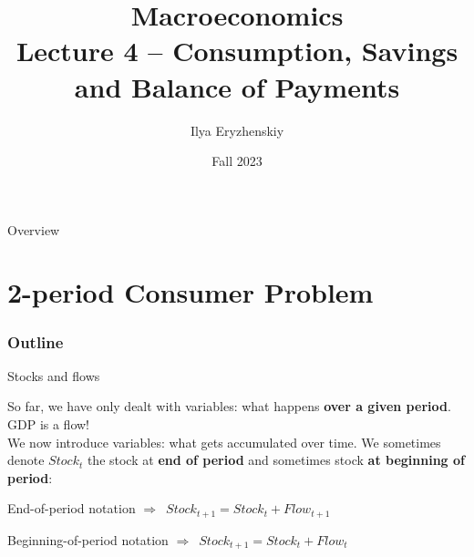 \documentclass{beamer}
\title[PSME]{Macroeconomics\\ Lecture 4 -- Consumption, Savings and Balance of Payments}
\author[I. Eryzhenskiy]{Ilya Eryzhenskiy}
\institute[BdF]{PSME Panth\'{e}on-Sorbonne Master in Economics}
\date[PSME macro]{Fall 2023}
\newcommand{\tb}[1]{{\color{blue}{\textbf{#1}}}}
\newenvironment{mytemize}
{\vfill\itemize[nolistsep,itemsep=\fill,label=\color{blue}{$\triangleright$}]}
  {\enditemize}
\newcommand{\rarr}{$\Rightarrow$\ }
\begin{document}
\begin{frame}
  \maketitle
\end{frame}

\begin{frame}{Overview}
  \tableofcontents
\end{frame}


\section{2-period Consumer Problem}
\begin{frame}
\frametitle{Outline}
\tableofcontents[currentsection]
\end{frame}

\begin{frame}{Stocks and flows}

So far, we have only dealt with \tb{flow} variables: what happens \textbf{over a given period}. GDP is a flow! \\
\vfill
We now introduce \tb{stock} variables: what gets accumulated over time. We sometimes denote $Stock_t$ the stock at \textbf{end of period} and sometimes stock \textbf{at beginning of period}:
\begin{mytemize}
    \item End-of-period notation \rarr $Stock_{t+1} = Stock_t + Flow_{t+1}$
    \item Beginning-of-period notation \rarr $Stock_{t+1} = Stock_t + Flow_{t}$
\end{mytemize}
\end{frame}
\end{document}
